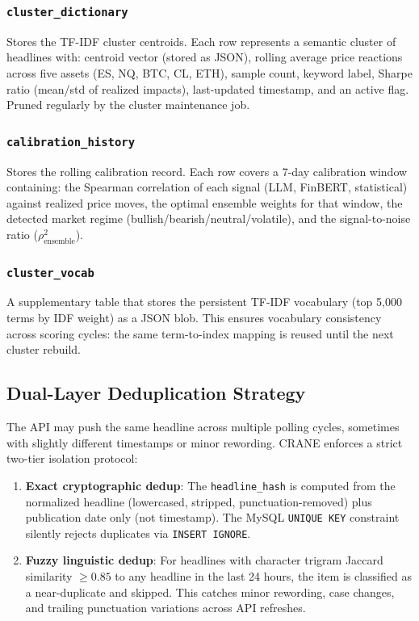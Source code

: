\subsubsection{\texttt{cluster\_dictionary}}

Stores the TF-IDF cluster centroids. Each row represents a semantic cluster of headlines with: centroid vector (stored as JSON), rolling average price reactions across five assets (ES, NQ, BTC, CL, ETH), sample count, keyword label, Sharpe ratio (mean/std of realized impacts), last-updated timestamp, and an active flag. Pruned regularly by the cluster maintenance job.

\subsubsection{\texttt{calibration\_history}}

Stores the rolling calibration record. Each row covers a 7-day calibration window containing: the Spearman correlation of each signal (LLM, FinBERT, statistical) against realized price moves, the optimal ensemble weights for that window, the detected market regime (bullish/bearish/neutral/volatile), and the signal-to-noise ratio ($\rho_{\text{ensemble}}^2$).

\subsubsection{\texttt{cluster\_vocab}}

A supplementary table that stores the persistent TF-IDF vocabulary (top 5,000 terms by IDF weight) as a JSON blob. This ensures vocabulary consistency across scoring cycles: the same term-to-index mapping is reused until the next cluster rebuild.

\subsection{Dual-Layer Deduplication Strategy}

The API may push the same headline across multiple polling cycles, sometimes with slightly different timestamps or minor rewording. CRANE enforces a strict two-tier isolation protocol:

\begin{enumerate}
    \item \textbf{Exact cryptographic dedup}: The \texttt{headline\_hash} is computed from the normalized headline (lowercased, stripped, punctuation-removed) plus publication date only (not timestamp). The MySQL \texttt{UNIQUE KEY} constraint silently rejects duplicates via \texttt{INSERT IGNORE}.

    \item \textbf{Fuzzy linguistic dedup}: For headlines with character trigram Jaccard similarity $\geq 0.85$ to any headline in the last 24 hours, the item is classified as a near-duplicate and skipped. This catches minor rewording, case changes, and trailing punctuation variations across API refreshes.
\end{enumerate}
